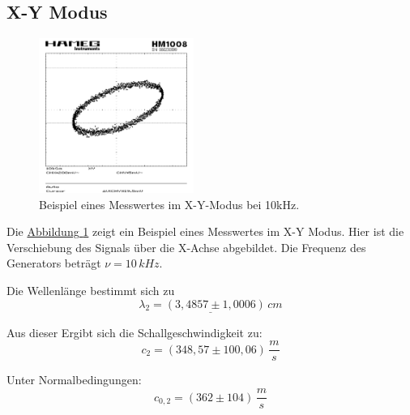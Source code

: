 \subsection{X-Y Modus}
\begin{figure}[!ht]
    \centering
    \includegraphics[width=0.45\textwidth]{img/26/YX.pdf}
    \caption{Beispiel eines Messwertes im X-Y-Modus bei 10kHz.}
    \label{fig:xy_modus}
\end{figure}

Die \hyperref[fig:xy_modus]{Abbildung \ref*{fig:xy_modus}} zeigt ein Beispiel eines Messwertes im X-Y Modus. Hier ist die Verschiebung des Signals über die X-Achse abgebildet. Die Frequenz des Generators beträgt $\nu = 10\,kHz$.

Die Wellenlänge bestimmt sich zu 
\begin{equation}
\underline{
    \lambda_2 = (3,4857 \pm 1,0006)\,cm
}
\end{equation}

Aus dieser Ergibt sich die Schallgeschwindigkeit zu:
\begin{equation}
\boxed{
    c_2 = (348,57 \pm 100,06)\,\frac{m}{s}
}
\end{equation}

Unter Normalbedingungen:
\begin{equation}
\boxed{
    c_{0,2} = (362 \pm 104)\,\frac{m}{s}
}
\end{equation}

